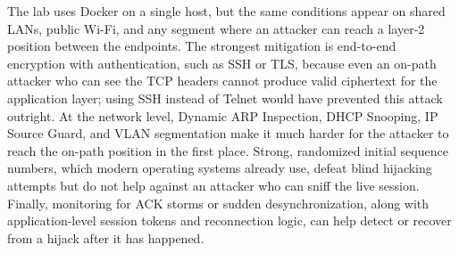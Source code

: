 The lab uses Docker on a single host, but the same conditions appear on shared LANs, public Wi-Fi, and any segment where an attacker can reach a layer-2 position between the endpoints. The strongest mitigation is end-to-end encryption with authentication, such as SSH or TLS, because even an on-path attacker who can see the TCP headers cannot produce valid ciphertext for the application layer; using SSH instead of Telnet would have prevented this attack outright. At the network level, Dynamic ARP Inspection, DHCP Snooping, IP Source Guard, and VLAN segmentation make it much harder for the attacker to reach the on-path position in the first place. Strong, randomized initial sequence numbers, which modern operating systems already use, defeat blind hijacking attempts but do not help against an attacker who can sniff the live session. Finally, monitoring for ACK storms or sudden desynchronization, along with application-level session tokens and reconnection logic, can help detect or recover from a hijack after it has happened.